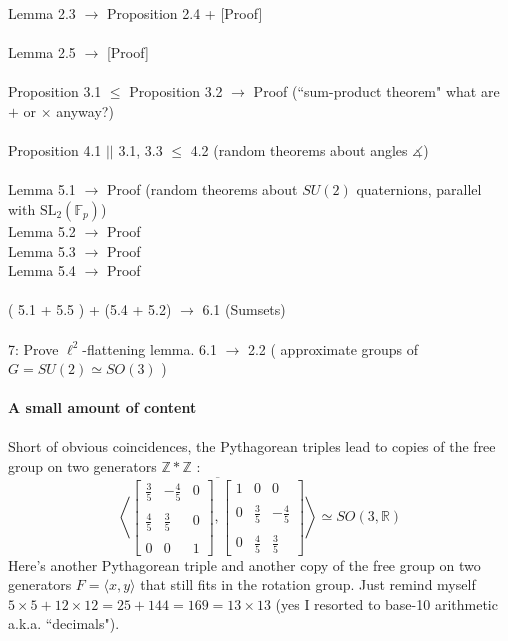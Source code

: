 \documentclass[12pt]{article}
\begin{document}
Lemma 2.3 $\to$ Proposition 2.4 + [Proof] \\ \\
Lemma 2.5 $\to$ [Proof] \\ \\
Proposition 3.1 $\leq$ Proposition 3.2 $\to$ Proof (``sum-product theorem" what are $+$ or $\times$ anyway?) \\ \\
Proposition 4.1 $||$ 3.1, 3.3 $\leq$ 4.2 (random theorems about angles $\measuredangle$)\\ \\
Lemma 5.1 $\to$ Proof (random theorems about $SU(2)$ quaternions, parallel with $\text{SL}_2(\mathbb{F}_p)$)\\
Lemma 5.2 $\to$ Proof \\
Lemma 5.3 $\to$ Proof \\
Lemma 5.4 $\to$ Proof \\ \\
( 5.1 + 5.5 ) + (5.4 + 5.2) $\to$ 6.1 (Sumsets) \\ \\
7: Prove $\ell^2$-flattening lemma.  6.1 $\to$ 2.2 ( approximate groups of $G = SU(2) \simeq SO(3)$ ) \\ \\
\textbf{A small amount of content}\\ \\
Short of obvious coincidences, the Pythagorean triples lead to copies of the free group on two generators $\mathbb{Z}*\mathbb{Z}$ :
$$ \overline{\left\langle \left[ 
\begin{array}{crc} \frac{3}{5} & -\frac{4}{5} & 0 \\ \\ 
\frac{4}{5} & \frac{3}{5} & 0 \\ \\
0 & 0 & 1 \end{array} \right], 
\left[ 
\begin{array}{ccr} 1 & 0 & 0 \\ \\ 0 & \frac{3}{5} & -\frac{4}{5}  \\ \\ 
0 & \frac{4}{5} & \frac{3}{5}  \end{array} \right] \right\rangle } \simeq SO(3, \mathbb{R})$$
Here's another Pythagorean triple and another copy of the free group on two generators $F = \langle x, y \rangle$ that still fits in the rotation group.  Just remind myself $5 \times 5 + 12 \times 12 = 25 + 144 = 169 = 13 \times 13$ (yes I resorted to base-10 arithmetic a.k.a. ``decimals").
\end{document}
